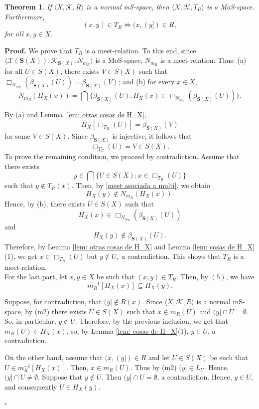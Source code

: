\documentclass{article}
\newtheorem{theorem}{\bf Theorem}[section]
\newenvironment{proof}
{\par\noindent\textbf{Proof. }\rm}
{\hfill$\boldsymbol{\square}$\par\vspace{0.3cm}}
\begin{document}
\begin{theorem}\label{binaria asociada a normal}
If $\langle X, \mathcal{K}, R \rangle$ is a normal mS-space, then  $\langle X, \mathcal{K},T_R\rangle$ is a MoS-space. Furthermore, 
\begin{equation}
(x,y) \in T_R \iff (x,(y]) \in R,
\end{equation}
for all $x,y\in X$.
\end{theorem}
\begin{proof}
We prove that $T_R$ is a meet-relation. To this end, since $\langle \mathcal{X}(\mathbf{S}(X)), \mathcal{K}_{\mathbf{S}(X)}, N_{m_R}\rangle$ is a MoS-space, $N_{m_R}$ is a meet-relation. Thus: (a) for all $U\in S(X)$, there exists $V\in S(X)$ such that $\Box_{N_{m_R}}(\beta_{\mathbf{S}(X)}(U))=\beta_{\mathbf{S}(X)}(V)$; and (b) for every $x\in X$,
\[
N_{m_R}(H_X(x))=\bigcap\{\beta_{\mathbf{S}(X)}(U)\colon H_X(x)\in \Box_{N_{m_R}}(\beta_{\mathbf{S}(X)}(U))\}.
\]

By (a) and Lemma \ref{lem: otras cosas de H_X},
\[
H_X[\Box_{T_R}(U)]
=
\beta_{\mathbf{S}(X)}(V)
\]
for some $V\in S(X)$. Since $\beta_{\mathbf{S}(X)}$ is injective, it follows that
\[
\Box_{T_R}(U)=V\in S(X).
\] To prove the remaining condition, we proceed by contradiction. Assume that there exists
\[
y\in \bigcap\{U\in S(X)\colon x\in \Box_{T_R}(U)\}
\]
such that $y\notin T_R(x)$. Then, by \eqref{meet asociada a multi}, we obtain
\[
H_X(y)\notin N_{m_R}(H_X(x)).
\]
Hence, by (b), there exists $U\in S(X)$ such that
\[
H_X(x)\in \Box_{N_{m_R}}(\beta_{\mathbf{S}(X)}(U))
\]
and
\[
H_X(y)\notin \beta_{\mathbf{S}(X)}(U).
\]
Therefore, by Lemma \ref{lem: otras cosas de H_X} and Lemma \ref{lem: cosas de H_X}(1), we get $x\in \Box_{T_R}(U)$ but $y\notin U,$ a contradiction. This shows that $T_R$ is a meet-relation.
\\
For the last part, let $x,y\in X$ be such that $(x,y)\in T_R$. Then, by $(5)$, we have
\[
m_R^{-1}[H_X(x)]\subseteq H_X(y).
\]

Suppose, for contradiction, that $(y]\notin R(x)$. Since $\langle X, \mathcal{K}, R \rangle$ is a normal mS-space, by (m2) there exists
$U\in S(X)$ such that $x\in m_R(U)$ and $(y]\cap U=\emptyset$. So, in particular, $y\notin U$. Therefore, by the previous inclusion, we get that $m_R(U)\in H_X(x)$, so, by Lemma \ref{lem: cosas de H_X}(1), $y\in U$, a contradiction.

On the other hand, assume that $(x,(y])\in R$ and let $U\in S(X)$ be such that $
U\in m_R^{-1}[H_X(x)]$. Then, $x\in m_R(U)$. Thus by (m2) $(y]\in L_U $. Hence,
$(y]\cap U\neq\emptyset $. Suppose that $y\notin U$. Then $(y]\cap U=\emptyset$, a contradiction. Hence,
$y\in U$, and consequently $
U\in H_X(y)$.

\end{proof}
\end{document}
